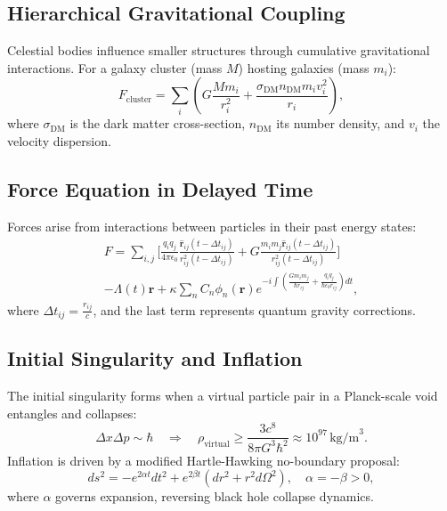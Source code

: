 \documentclass[12pt, a4paper]{article}
\begin{document}
\subsection{Hierarchical Gravitational Coupling}
Celestial bodies influence smaller structures through cumulative gravitational interactions. For a galaxy cluster (mass \( M \)) hosting galaxies (mass \( m_i \)):
\begin{equation}
F_{\text{cluster}} = \sum_i \left( G \frac{M m_i}{r_i^2} + \frac{\sigma_{\text{DM}} n_{\text{DM}} m_i v_i^2}{r_i} \right), \label{eq:hierarchy}
\end{equation}
where \( \sigma_{\text{DM}} \) is the dark matter cross-section, \( n_{\text{DM}} \) its number density, and \( v_i \) the velocity dispersion.

\subsection{Force Equation in Delayed Time}
Forces arise from interactions between particles in their past energy states:
\begin{multline}
F = \sum_{i,j} \Bigg[ \frac{q_i q_j}{4\pi \epsilon_0} \frac{\hat{\bm{r}}_{ij}(t - \Delta t_{ij})}{r_{ij}^2(t - \Delta t_{ij})} + G \frac{m_i m_j \hat{\bm{r}}_{ij}(t - \Delta t_{ij})}{r_{ij}^2(t - \Delta t_{ij})} \Bigg] \\
- \Lambda(t) \bm{r} + \kappa \sum_{n} C_n \phi_n(\bm{r}) e^{-i \int \left( \frac{G m_i m_j}{\hbar r_{ij}} + \frac{q_i q_j}{\hbar \epsilon_0 r_{ij}} \right) dt}, \label{eq:force}
\end{multline}
where \( \Delta t_{ij} = \frac{r_{ij}}{c} \), and the last term represents quantum gravity corrections.

\subsection{Initial Singularity and Inflation}
The initial singularity forms when a virtual particle pair in a Planck-scale void entangles and collapses:
\begin{equation}
\Delta x \Delta p \sim \hbar \quad \Rightarrow \quad \rho_{\text{virtual}} \geq \frac{3c^8}{8\pi G^3 \hbar^2} \approx 10^{97} \, \text{kg/m}^3. \label{eq:singularity}
\end{equation}
Inflation is driven by a modified Hartle-Hawking no-boundary proposal:
\begin{equation}
ds^2 = -e^{2\alpha t} dt^2 + e^{2\beta t} \left( dr^2 + r^2 d\Omega^2 \right), \quad \alpha = -\beta > 0, \label{eq:metric}
\end{equation}
where \( \alpha \) governs expansion, reversing black hole collapse dynamics.
\end{document}
